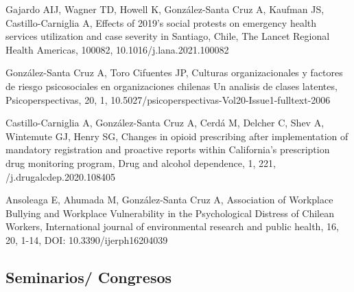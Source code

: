 \documentclass[11pt,a4paper,]{awesome-cv}
\begin{document}
\begin{cventries}
{\begin{cvitems}
\item Gajardo AIJ, Wagner TD, Howell K, González-Santa Cruz A, Kaufman JS, Castillo-Carniglia A, Effects of 2019's social protests on emergency health services utilization and case severity in Santiago, Chile, The Lancet Regional Health Americas, 100082, 10.1016/j.lana.2021.100082
\item González-Santa Cruz A, Toro Cifuentes JP, Culturas organizacionales y factores de riesgo psicosociales en organizaciones chilenas Un analisis de clases latentes, Psicoperspectivas, 20, 1, 10.5027/psicoperspectivas-Vol20-Issue1-fulltext-2006
\item Castillo-Carniglia A, González-Santa Cruz A, Cerdá M, Delcher C, Shev A, Wintemute GJ, Henry SG, Changes in opioid prescribing after implementation of mandatory registration and proactive reports within California's prescription drug monitoring program, Drug and alcohol dependence, 1, 221, /j.drugalcdep.2020.108405
\item Ansoleaga E, Ahumada M, González-Santa Cruz A, Association of Workplace Bullying and Workplace Vulnerability in the Psychological Distress of Chilean Workers, International journal of environmental research and public health, 16, 20, 1-14, DOI: 10.3390/ijerph16204039
\end{cvitems}}
\end{cventries}

\hypertarget{seminarios-congresos-1}{%
\subsection{Seminarios/ Congresos}\label{seminarios-congresos-1}}
\end{document}
